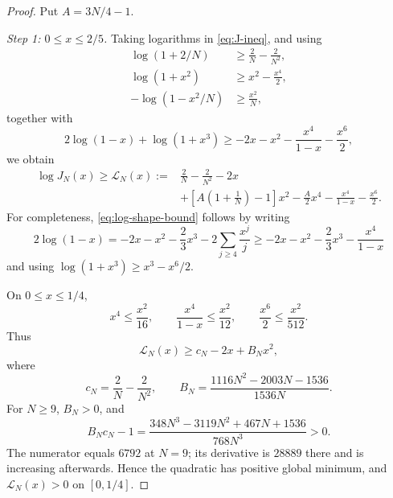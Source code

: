 \documentclass[11pt]{article}
\begin{document}
\begin{proof}
Put \(A=3N/4-1\).

\smallskip
\noindent\emph{Step 1: \(0\le x\le2/5\).}
Taking logarithms in \eqref{eq:J-ineq}, and using
\begin{align*}
 \log(1+2/N)&\ge\frac2N-\frac2{N^2},\\
 \log(1+x^2)&\ge x^2-\frac{x^4}{2},\\
 -\log(1-x^2/N)&\ge\frac{x^2}{N},
\end{align*}
together with
\begin{equation}\label{eq:log-shape-bound}
 2\log(1-x)+\log(1+x^3)
 \ge-2x-x^2-\frac{x^4}{1-x}-\frac{x^6}{2},
\end{equation}
we obtain
\begin{equation}\label{eq:L-N-def}
\begin{aligned}
 \log J_N(x)\ge\mathcal L_N(x):={}&
 \frac2N-\frac2{N^2}-2x\\
 &+\left[A\left(1+\frac1N\right)-1\right]x^2
 -\frac A2x^4-\frac{x^4}{1-x}-\frac{x^6}{2}.
\end{aligned}
\end{equation}
For completeness, \eqref{eq:log-shape-bound} follows by writing
\[
 2\log(1-x)
 =-2x-x^2-\frac23x^3-2\sum_{j\ge4}\frac{x^j}{j}
 \ge-2x-x^2-\frac23x^3-\frac{x^4}{1-x}
\]
and using \(\log(1+x^3)\ge x^3-x^6/2\).

On \(0\le x\le1/4\),
\[
 x^4\le\frac{x^2}{16},
 \qquad
 \frac{x^4}{1-x}\le\frac{x^2}{12},
 \qquad
 \frac{x^6}{2}\le\frac{x^2}{512}.
\]
Thus
\[
       \mathcal L_N(x)\ge c_N-2x+B_Nx^2,
\]
where
\[
 c_N=\frac2N-\frac2{N^2},
 \qquad
 B_N=\frac{1116N^2-2003N-1536}{1536N}.
\]
For \(N\ge9\), \(B_N>0\), and
\begin{equation}\label{eq:discriminant-check}
 B_Nc_N-1
 =\frac{348N^3-3119N^2+467N+1536}{768N^3}>0.
\end{equation}
The numerator equals \(6792\) at \(N=9\); its derivative is \(28889\)
there and is increasing afterwards.  Hence the quadratic has positive global
minimum, and \(\mathcal L_N(x)>0\) on \([0,1/4]\).


\end{proof}
\end{document}
